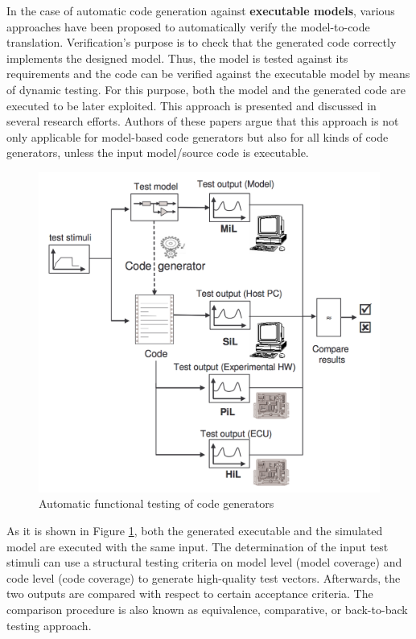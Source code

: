 In the case of automatic code generation against \textbf{executable models}, various approaches have been proposed to automatically verify the model-to-code translation. Verification's purpose is to check that the generated code correctly implements the designed model. Thus, the model is tested against its requirements and the code can be verified against the executable model by means of dynamic testing. For this purpose, both the model and the generated code are executed to be later exploited. This approach is presented and discussed in several research efforts\cite{sturmer2005overview,stuermer2007systematic,conrad2010code,jorges2014back,burnard2004verifying}. Authors of these papers argue that this approach is not only applicable for model-based code generators but also for all kinds of code generators, unless the input model/source code is executable.

\begin{figure}[h]
	\center
	\includegraphics[scale=0.6]{SOTA/fig/testing_process}
	\caption{Automatic functional testing of code generators}
	\label{fig:Process for testing automatically generated code}
\end{figure}

As it is shown in Figure \ref{fig:Process for testing automatically generated code}, both the generated executable and the simulated model are executed with the same input. 
The determination of the input test stimuli can use a structural testing criteria on model level (model coverage) and code level (code coverage) to generate high-quality test vectors.
Afterwards, the two outputs are compared with respect
to certain acceptance criteria. The comparison procedure is also known as equivalence, comparative, or back-to-back testing approach\cite{vouk1990back,mckeeman1998differential}.
 
